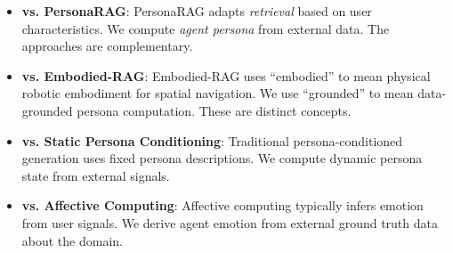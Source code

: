 \documentclass[11pt]{article}
\begin{document}
\begin{itemize}
    \item \textbf{vs. PersonaRAG}: PersonaRAG adapts \textit{retrieval} based on user characteristics. We compute \textit{agent persona} from external data. The approaches are complementary.

    \item \textbf{vs. Embodied-RAG}: Embodied-RAG uses ``embodied'' to mean physical robotic embodiment for spatial navigation. We use ``grounded'' to mean data-grounded persona computation. These are distinct concepts.

    \item \textbf{vs. Static Persona Conditioning}: Traditional persona-conditioned generation uses fixed persona descriptions. We compute dynamic persona state from external signals.

    \item \textbf{vs. Affective Computing}: Affective computing typically infers emotion from user signals. We derive agent emotion from external ground truth data about the domain.
\end{itemize}
\end{document}
